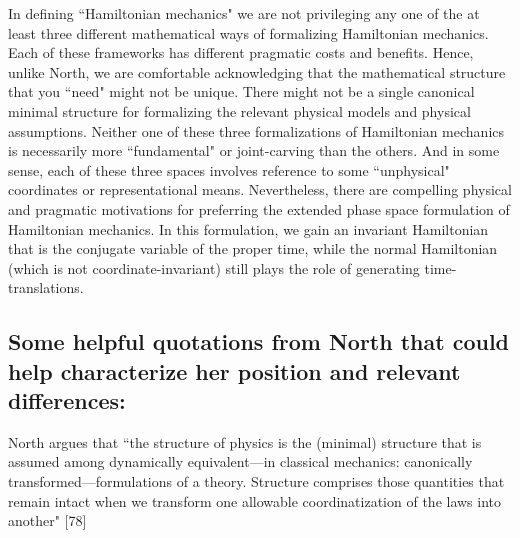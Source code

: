 \documentclass[letterpaper]{article}
\begin{document}
In defining ``Hamiltonian mechanics" we are not privileging any one of the at least three different mathematical ways of formalizing Hamiltonian mechanics. Each of these frameworks has different pragmatic costs and benefits. Hence, unlike North, we are comfortable acknowledging that the mathematical structure that you ``need" might not be unique. There might not be a single canonical minimal structure for formalizing the relevant physical models and physical assumptions. Neither one of these three formalizations of Hamiltonian mechanics is necessarily more ``fundamental" or joint-carving than the others. And in some sense, each of these three spaces involves reference to some ``unphysical" coordinates or representational means. Nevertheless, there are compelling physical and pragmatic motivations for preferring the extended phase space formulation of Hamiltonian mechanics. In this formulation, we gain an invariant Hamiltonian that is the conjugate variable of the proper time, while the normal Hamiltonian (which is not coordinate-invariant) still plays the role of generating time-translations.

\subsection{Some helpful quotations from North that could help characterize her position and relevant differences:} 

North argues that ``the structure of physics is the (minimal) structure that is assumed among dynamically equivalent---in classical mechanics: canonically transformed---formulations of a theory. Structure comprises those quantities that remain intact when we transform one allowable coordinatization of the laws into another" [78]
\end{document}
